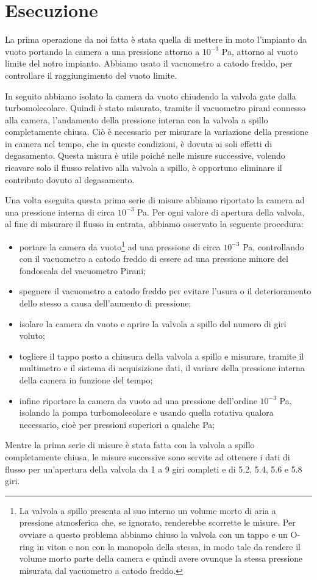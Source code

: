 \section{Esecuzione}

La prima operazione da noi fatta è stata quella di mettere in moto l'impianto da vuoto portando la camera a una pressione attorno a $10^{-3}$ \si{\pascal}, attorno al vuoto limite del notro impianto. Abbiamo usato il vacuometro a catodo freddo, per controllare il raggiungimento del vuoto limite.

In seguito abbiamo isolato la camera da vuoto chiudendo la valvola gate dalla turbomolecolare. Quindi è stato misurato, tramite il vacuometro pirani connesso alla camera, l'andamento della pressione interna con la valvola a spillo completamente chiusa. Ciò è necessario per misurare la variazione della pressione in camera nel tempo, che in queste condizioni, è dovuta ai soli effetti di degasamento. Questa misura è utile poiché nelle misure successive, volendo ricavare solo il flusso relativo alla valvola a spillo, è opportuno eliminare il contributo dovuto al degasamento. 

Una volta eseguita questa prima serie di misure abbiamo riportato la camera ad una pressione interna di circa $10^{-3}$ \si{\pascal}. Per ogni valore di apertura della valvola, al fine di misurare il flusso in entrata, abbiamo osservato la seguente procedura:
\begin{itemize}
	\item{portare la camera da vuoto\footnote{La valvola a spillo presenta al suo interno un volume morto di aria a pressione atmosferica che, se ignorato, renderebbe scorrette le misure. Per ovviare a questo problema abbiamo chiuso la valvola con un tappo e un O-ring in viton e non con la manopola della stessa, in modo tale da rendere il volume morto parte della camera e quindi avere ovunque la stessa pressione misurata dal vacuometro a catodo freddo.} ad una pressione di circa $10^{-3}$ \si{\pascal}, controllando con il vacuometro a catodo freddo di essere ad una pressione minore del fondoscala del vacuometro Pirani;}
	\item{spegnere il vacuometro a catodo freddo per evitare l'usura o il deterioramento dello stesso a causa dell'aumento di pressione;}
	\item{isolare la camera da vuoto e aprire la valvola a spillo del numero di giri voluto;}
	\item{togliere il tappo posto a chiusura della valvola a spillo e misurare, tramite il multimetro e il sistema di acquisizione dati, il variare della pressione interna della camera in funzione del tempo;}
	\item{infine riportare la camera da vuoto ad una pressione dell'ordine $10^{-3}$ \si{\pascal}, isolando la pompa turbomolecolare e usando quella rotativa qualora necessario, cioè per pressioni superiori a qualche Pa;}
\end{itemize}
Mentre la prima serie di misure è stata fatta con la valvola a spillo completamente chiusa, le misure successive sono servite ad ottenere i dati di flusso per un'apertura della valvola da 1 a 9 giri completi e di 5.2, 5.4, 5.6 e 5.8 giri.\\

